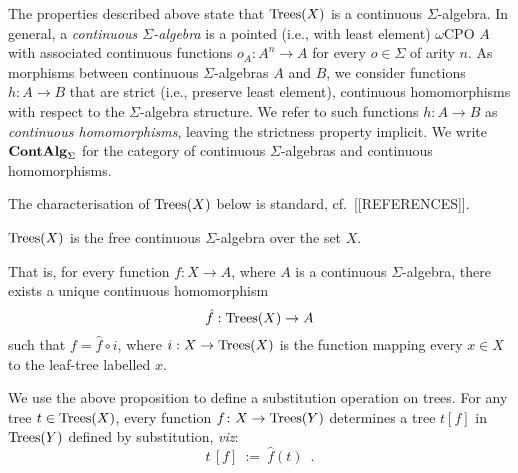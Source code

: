 The properties described above state that $\textnormal{Trees}(X)$ is a continuous $\Sigma$-algebra. In general,
a \emph{continuous $\Sigma$-algebra} is a pointed (i.e., with least element) $\omega$CPO $A$ with associated
continuous functions $o_A : A^n \to A$ for every $o \in \Sigma$ of arity $n$. 
As morphisms between continuous $\Sigma$-algebras
$A$ and $B$, we consider functions $h: A \to B$  that are strict (i.e., preserve least element), continuous homomorphisms with respect to the $\Sigma$-algebra structure. 
We refer to such  functions $h: A \to B$ as \emph{continuous homomorphisms}, leaving the strictness property implicit.
We write $\mathbf{ContAlg}_\Sigma$ for the category of continuous $\Sigma$-algebras and continuous homomorphisms.

The characterisation of $\textnormal{Trees}(X)$ below is standard, cf.\ [[REFERENCES]].
\begin{aproposition}
$\textnormal{Trees}(X)$ is the free
    continuous $\Sigma$-algebra over the set $X$.
   \begin{center}
    \end{center}
    That is, for every function $f : X \to A$, where 
    $A$ is a continuous $\Sigma$-algebra,
    there exists a unique continuous homomorphism $$\hat{f} : \textnormal{Trees}(X) \to A$$
    such that $
        f = \hat{f} \circ i $, where $i : X \to \textnormal{Trees}(X)$ is the function mapping every $x \in X$ to the 
        leaf-tree labelled $x$.
 \end{aproposition}
 
 We use the above proposition to define a substitution operation on trees. For any tree $t \in \textnormal{Trees}(X)$, 
 every function $f \colon X \to \textnormal{Trees}(Y)$ determines a tree $t[f]$ in $\textnormal{Trees}(Y)$ defined by substitution, \emph{viz}:
 \[t\,[f] ~ := ~ \hat{f}(t) \enspace .
 \]
